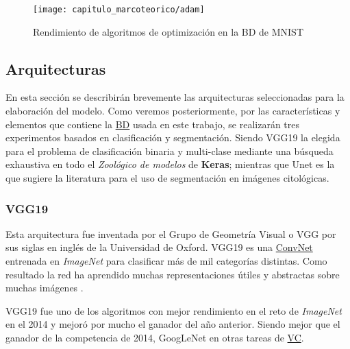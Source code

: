 \begin{figure}[H]
    \centering
    \texttt{[image: capitulo\_marcoteorico/adam]}
    \caption{Rendimiento de algoritmos de optimización en la BD de MNIST}\label{fig:adam}
\end{figure}

\subsection{Arquitecturas}

En esta sección se describirán brevemente las arquitecturas seleccionadas para
la elaboración del modelo. Como veremos posteriormente, por las características
y elementos que contiene la \hyperlink{abbr}{BD} usada en este trabajo, se
realizarán tres experimentos basados en clasificación y segmentación. Siendo
VGG19 la elegida para el problema de clasificación binaria y multi-clase
mediante una búsqueda exhaustiva en todo el \emph{Zoológico de modelos} de
\textbf{Keras}; mientras que Unet es la que sugiere la literatura para el uso de
segmentación en imágenes citológicas. 

\subsubsection{VGG19}

Esta arquitectura fue inventada por el Grupo de Geometría Visual o VGG por sus
siglas en inglés de la Universidad de Oxford. VGG19 es una
\hyperlink{abbr}{ConvNet} entrenada en \emph{ImageNet} para clasificar más de
mil categorías distintas. Como resultado la red ha aprendido muchas
representaciones útiles y abstractas sobre muchas imágenes \cite{Simonyan2014}. 

VGG19 fue uno de los algoritmos con mejor rendimiento en el reto de
\emph{ImageNet} en el 2014 y mejoró por mucho el ganador del año anterior.
Siendo mejor que el ganador de la competencia de 2014, GoogLeNet en otras tareas
de \hyperlink{abbr}{VC}.

